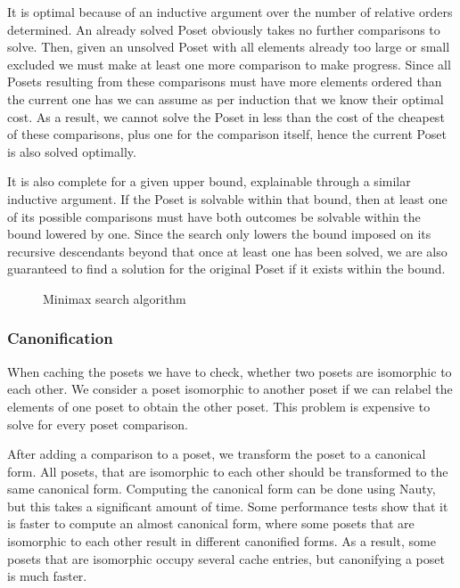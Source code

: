 \documentclass[10pt,journal,compsoc]{IEEEtran}
\begin{document}
It is optimal because of an inductive argument over the number of relative orders determined. An
already solved Poset obviously takes no further comparisons to solve. Then, given an unsolved Poset
with all elements already too large or small excluded we must make at least one more comparison to
make progress. Since all Posets resulting from these comparisons must have more elements ordered
than the current one has we can assume as per induction that we know their optimal cost. As a result, we
cannot solve the Poset in less than the cost of the cheapest of these comparisons, plus one for the
comparison itself, hence the current Poset is also solved optimally.

It is also complete for a given upper bound, explainable through a similar inductive argument. If
the Poset is solvable within that bound, then at least one of its possible comparisons must have both
outcomes be solvable within the bound lowered by one. Since the search only lowers the bound imposed
on its recursive descendants beyond that once at least one has been solved, we are also guaranteed
to find a solution for the original Poset if it exists within the bound.

\begin{figure}
  
  \caption{Minimax search algorithm}
  \label{fig:minimax_search}
\end{figure}

\subsubsection{Canonification}

When caching the posets we have to check, whether two posets are isomorphic to each other.
We consider a poset isomorphic to another poset if we can relabel the elements of one poset to obtain the other poset.
This problem is expensive to solve for every poset comparison.

After adding a comparison to a poset, we transform the poset to a canonical form.
All posets, that are isomorphic to each other should be transformed to the same canonical form.
Computing the canonical form can be done using Nauty, but this takes a significant amount of time.
Some performance tests show that it is faster to compute an almost canonical form, where some posets that are isomorphic to each other result in different canonified forms.
As a result, some posets that are isomorphic occupy several cache entries, but canonifying a poset is much faster.
\end{document}
